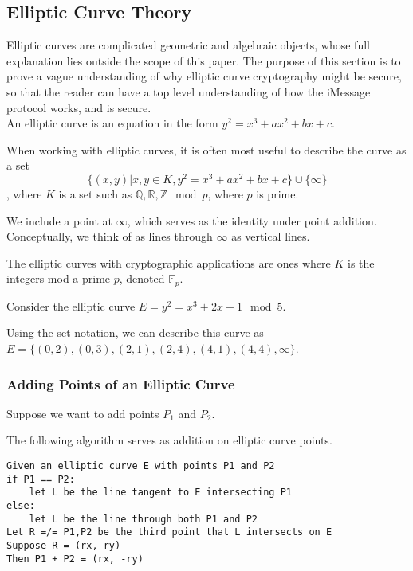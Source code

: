 \subsection{Elliptic Curve Theory}

Elliptic curves are complicated geometric and algebraic objects,
whose full explanation lies outside the scope of this paper.
The purpose of this section is to prove a vague understanding
of why elliptic curve cryptography might be secure, so that the reader
can have a top level understanding of how the iMessage protocol
works, and is secure.\\

An elliptic curve is an equation in the form $y^2 = x^3 + ax^2 + bx + c$.

When working with elliptic curves, it is often most useful to describe the curve as a set
$$\{(x,y) \vert x,y \in K, y^2 = x^3 + ax^2 + bx + c\} \cup \{ \infty \}$$, where $K$ is a set such as
$\mathbb{Q}, \mathbb{R}, \mathbb{Z} \mod p$, where $p$ is prime.

We include a point at
$\infty$, which serves as the identity under point addition.
Conceptually, we think of as lines through $\infty$
as vertical lines.

The elliptic curves with cryptographic applications are ones where $K$ is the integers
mod a prime $p$, denoted $\mathbb{F}_p$.

\begin{example}
Consider the elliptic curve $E = y^2 = x^3+2x-1 \mod 5$.

Using the set notation, we can describe this curve as
$E = \{(0 ,2 ),(0,3),(2,1),(2 ,4 ),(4,1),(4,4), \infty\}$.
\end{example}




\subsubsection{Adding Points of an Elliptic Curve}
Suppose we want to add points $P_1$ and $P_2$.

The following algorithm serves as addition on elliptic curve points.
\begin{center}
\begin{verbatim}
Given an elliptic curve E with points P1 and P2
if P1 == P2:
    let L be the line tangent to E intersecting P1
else:
    let L be the line through both P1 and P2
Let R =/= P1,P2 be the third point that L intersects on E
Suppose R = (rx, ry)
Then P1 + P2 = (rx, -ry)
\end{verbatim}
\end{center}

